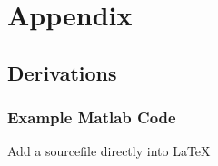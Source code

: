 \chapter{Appendix}
\label{c:appendix}


\section{Derivations}
\label{s:appendic_derivations}



\newpage
\subsection{Example Matlab Code}
\label{ss:app_kalman_matlab}

Add a sourcefile directly into \LaTeX














